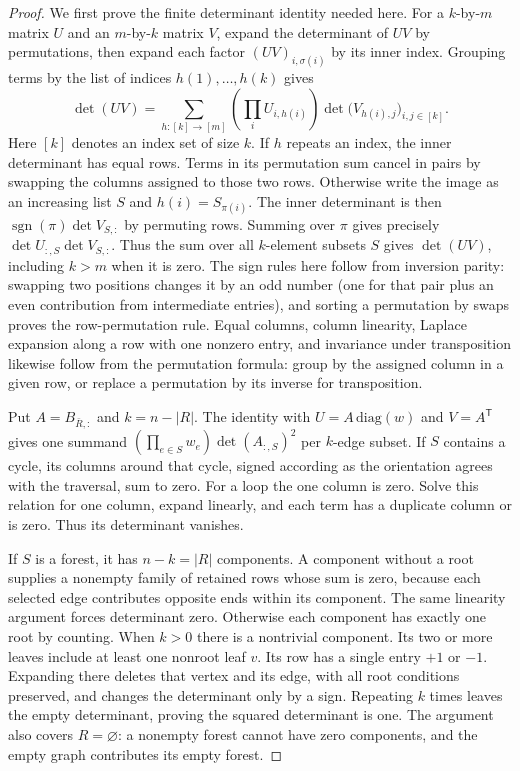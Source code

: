 \begin{proof}
We first prove the finite determinant identity needed here. For a $k$-by-$m$ matrix $U$ and an $m$-by-$k$ matrix $V$, expand the determinant of $UV$ by permutations, then expand each factor $(UV)_{i,\sigma(i)}$ by its inner index. Grouping terms by the list of indices $h(1),\ldots,h(k)$ gives
\[
  \det(UV)=\sum_{h:[k]\to[m]}
    \left(\prod_i U_{i,h(i)}\right)
    \det\big(V_{h(i),j}\big)_{i,j\in[k]} .
\]
Here $[k]$ denotes an index set of size $k$. If $h$ repeats an index, the inner determinant has equal rows. Terms in its permutation sum cancel in pairs by swapping the columns assigned to those two rows. Otherwise write the image as an increasing list $S$ and $h(i)=S_{\pi(i)}$. The inner determinant is then $\operatorname{sgn}(\pi)\det V_{S,:}$ by permuting rows. Summing over $\pi$ gives precisely $\det U_{:,S}\det V_{S,:}$. Thus the sum over all $k$-element subsets $S$ gives $\det(UV)$, including $k>m$ when it is zero. The sign rules here follow from inversion parity: swapping two positions changes it by an odd number (one for that pair plus an even contribution from intermediate entries), and sorting a permutation by swaps proves the row-permutation rule. Equal columns, column linearity, Laplace expansion along a row with one nonzero entry, and invariance under transposition likewise follow from the permutation formula: group by the assigned column in a given row, or replace a permutation by its inverse for transposition.

Put $A=B_{\bar R,:}$ and $k=n-|R|$. The identity with $U=A\,\mathrm{diag}(w)$ and $V=A^{\mathsf T}$ gives one summand $(\prod_{e\in S}w_e)\det(A_{:,S})^2$ per $k$-edge subset. If $S$ contains a cycle, its columns around that cycle, signed according as the orientation agrees with the traversal, sum to zero. For a loop the one column is zero. Solve this relation for one column, expand linearly, and each term has a duplicate column or is zero. Thus its determinant vanishes.

If $S$ is a forest, it has $n-k=|R|$ components. A component without a root supplies a nonempty family of retained rows whose sum is zero, because each selected edge contributes opposite ends within its component. The same linearity argument forces determinant zero. Otherwise each component has exactly one root by counting. When $k>0$ there is a nontrivial component. Its two or more leaves include at least one nonroot leaf $v$. Its row has a single entry $+1$ or $-1$. Expanding there deletes that vertex and its edge, with all root conditions preserved, and changes the determinant only by a sign. Repeating $k$ times leaves the empty determinant, proving the squared determinant is one. The argument also covers $R=\varnothing$: a nonempty forest cannot have zero components, and the empty graph contributes its empty forest.
\end{proof}

